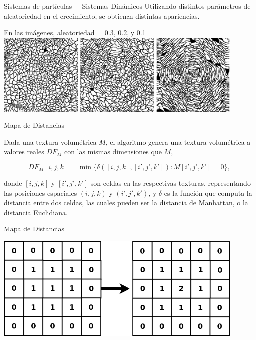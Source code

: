 \documentclass[spanish]{beamer}
\begin{document}
\begin{frame}{Sistemas de partículas + Sistemas Dinámicos}
Utilizando distintos parámetros de aleatoriedad en el crecimiento, se obtienen distintas apariencias.

En las imágenes, aleatoriedad = 0.3, 0.2, y 0.1
  \includegraphics[width=12cm]{../figures/Fig3}
\end{frame}

\begin{frame}{Mapa de Distancias}

Dada una textura volumétrica $M$, el algoritmo genera una textura volumétrica a valores reales $DF_{M}$ con las mismas dimensiones que $M$,


$$DF_{M}[i,j,k] = \min \bigg\{ \delta([i,j,k],[i',j',k']): M[i',j',k'] = 0 \bigg\},$$


\noindent donde $[i,j,k]$ y $[i',j',k']$ son celdas en las respectivas texturas, representando las posiciones espaciales $(i,j,k)$ y $(i',j',k')$, y $\delta$ es la función que computa la distancia entre dos celdas, las cuales pueden ser la distancia de Manhattan, o la distancia Euclidiana.

\end{frame}

\begin{frame}{Mapa de Distancias}

\centerline{\includegraphics[width=12cm]{../figures/distance}}

\end{frame}
\end{document}
